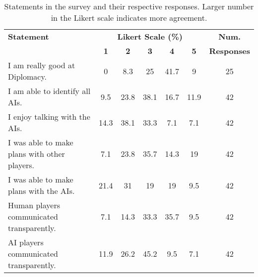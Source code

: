 \begin{table*}
\centering
\begin{tabular}{l | ccccc | c}
 \toprule
 \textbf{Statement} & \multicolumn{5}{c|}{\textbf{Likert Scale (\%)}} & \multicolumn{1}{c}{\textbf{Num.}} \\
  & \textbf{1} & \textbf{2} & \textbf{3} & \textbf{4} & \textbf{5} & \textbf{Responses}  \\
  \midrule
 I am really good at Diplomacy.&0&8.3&25&41.7&9&25\\
 I am able to identify all AIs.&9.5&23.8&38.1&16.7&11.9&42\\
 I enjoy talking with the AIs.&14.3&38.1&33.3&7.1&7.1&42\\
 I was able to make plans with other players.&7.1&23.8&35.7&14.3&19&42 \\
 I was able to make plans with the AIs.& 21.4 & 31 & 19 & 19 & 9.5 &42\\
 Human players communicated transparently.& 7.1 & 14.3 & 33.3 & 35.7 & 9.5 &42 \\
 AI players communicated transparently.& 11.9 & 26.2 & 45.2 & 9.5 & 7.1 &42 \\
 \hline
\end{tabular}
\caption{Statements in the survey and their respective responses. Larger number in the Likert scale indicates more agreement.}
\label{tab:distribution}
\end{table*}